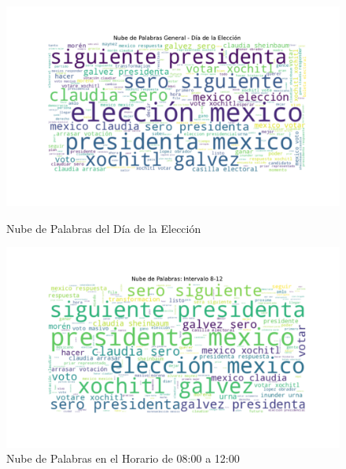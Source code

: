 \documentclass[10pt, a4paper]{article}
\begin{document}
	\begin{figure}[h!]
		\centering
		\begin{minipage}{0.49\textwidth} %
			\includegraphics[width=\linewidth]{nube_general_eleccion.pdf} 
			\vspace{-10mm}
			\caption{Nube de Palabras del Día de la Elección}
			\label{fig:nubeDiaEleccion}
		\end{minipage}
		\hfill %
		\begin{minipage}{0.49\textwidth}
			\includegraphics[width=\linewidth]{nube_intervalo_8-12.pdf}
			\vspace{-10mm}
			\caption{Nube de Palabras en el Horario de 08:00 a 12:00}
			\label{fig:nubeIntervalo812}
		\end{minipage}
	\end{figure}
	
\end{document}
